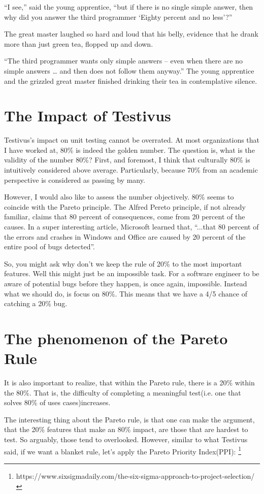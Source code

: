 {“I see,” said the young apprentice, “but if there is no single simple answer,
then why did you answer the third programmer ‘Eighty percent and no less’?”

The great master laughed so hard and loud that his belly, evidence that he
drank more than just green tea, flopped up and down.

“The third programmer wants only simple answers – even when there are no simple
answers … and then does not follow them anyway.” The young apprentice and the
grizzled great master finished drinking their tea in contemplative silence.
}

\section{The Impact of Testivus}
Testivus's impact on unit testing cannot be overrated. At most organizations
that I have worked at, 80\% is indeed the golden number. The question is, what
is the validity of the number 80\%? First, and foremost, I think that culturally
80\% is intuitively considered above average. Particularly, because 70\% from an
academic perspective is considered as passing by many.

However, I would also like to assess the number objectively. 80\% seems to
coincide with the Pareto principle. The Alfred Pereto principle, if not already
familiar, claims that 80 percent of consequences, come from 20 percent of the
causes. In a super interesting article, Microsoft learned that, ``...that 80
percent of the errors and crashes in Windows and Office are caused by 20 percent
of the entire pool of bugs detected''.

So, you might ask why don't we keep the rule of 20\% to the most important
features. Well this might just be an impossible task. For a software engineer
to be aware of potential bugs before they happen, is once again, impossible.
Instead what we should do, is focus on 80\%. This means that we have a 4/5
chance of catching a 20\% bug.

\section{The phenomenon of the Pareto Rule}
It is also important to realize, that within the  Pareto rule, there is a 20\%
within the 80\%. That is, the difficulty of  completing a meaningful test(i.e.
one that solves 80\% of uses cases)increases.

The interesting thing about the Pareto rule, is that one can make the argument,
that the 20\% features that make an 80\% impact, are those that are hardest to
test. So arguably, those tend to overlooked. However, similar to what Testivus
said, if we want a blanket rule, let's apply the Pareto Priority Index(PPI):
\footnote{https://www.sixsigmadaily.com/the-six-sigma-approach-to-project-selection/}

